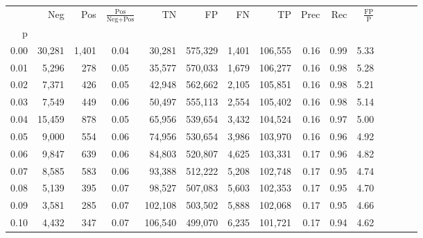 \begin{tabular}{rrrcrrrrrrrrrrr}
\toprule
{} &     Neg &    Pos & $\frac{\text{Pos}}{\text{Neg}+\text{Pos}}$ &       TN &       FP &       FN &       TP &  Prec &   Rec & $\frac{\text{FP}}{\text{P}}$ \\
p    &         &        &                                            &          &          &          &          &       &       &                              \\
\midrule
0.00 &  30,281 &  1,401 &                                       0.04 &   30,281 &  575,329 &    1,401 &  106,555 &  0.16 &  0.99 &                         5.33 \\
0.01 &   5,296 &    278 &                                       0.05 &   35,577 &  570,033 &    1,679 &  106,277 &  0.16 &  0.98 &                         5.28 \\
0.02 &   7,371 &    426 &                                       0.05 &   42,948 &  562,662 &    2,105 &  105,851 &  0.16 &  0.98 &                         5.21 \\
0.03 &   7,549 &    449 &                                       0.06 &   50,497 &  555,113 &    2,554 &  105,402 &  0.16 &  0.98 &                         5.14 \\
0.04 &  15,459 &    878 &                                       0.05 &   65,956 &  539,654 &    3,432 &  104,524 &  0.16 &  0.97 &                         5.00 \\
0.05 &   9,000 &    554 &                                       0.06 &   74,956 &  530,654 &    3,986 &  103,970 &  0.16 &  0.96 &                         4.92 \\
0.06 &   9,847 &    639 &                                       0.06 &   84,803 &  520,807 &    4,625 &  103,331 &  0.17 &  0.96 &                         4.82 \\
0.07 &   8,585 &    583 &                                       0.06 &   93,388 &  512,222 &    5,208 &  102,748 &  0.17 &  0.95 &                         4.74 \\
0.08 &   5,139 &    395 &                                       0.07 &   98,527 &  507,083 &    5,603 &  102,353 &  0.17 &  0.95 &                         4.70 \\
0.09 &   3,581 &    285 &                                       0.07 &  102,108 &  503,502 &    5,888 &  102,068 &  0.17 &  0.95 &                         4.66 \\
0.10 &   4,432 &    347 &                                       0.07 &  106,540 &  499,070 &    6,235 &  101,721 &  0.17 &  0.94 &                         4.62 \\

\end{tabular}
